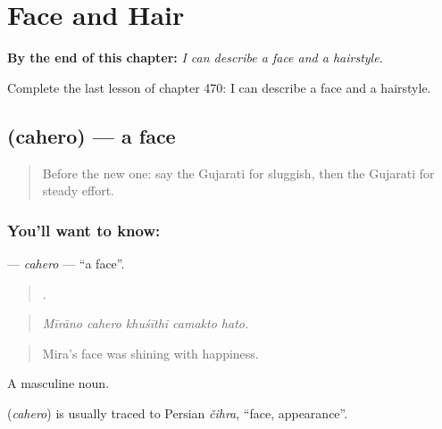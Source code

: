 
\chapter{Face and Hair}
\label{ch:gu-face-and-hair}

\begin{chapteropening}
\textbf{By the end of this chapter:} \emph{I can describe a face and a hairstyle.}

Complete the last lesson of chapter 470: I can describe a face and a hairstyle.
\end{chapteropening}

\section[\texorpdfstring{\gu{ચહેરો} (cahero)}{ચહેરો (cahero)}]{ (cahero) — a face}

\label{lesson:GU-C470-cahero}



\begin{quote}
Before the new one: say the Gujarati for sluggish, then the Gujarati for steady effort.
\end{quote}

\subsection*{You'll want to know: }
\textbf{} — \emph{cahero} — \textquotedblleft{}a face\textquotedblright{}.

\begin{quote}
    .
\end{quote}

\begin{quote}
\emph{Mīrāno cahero khuśīthī camakto hato.}
\end{quote}

\begin{quote}
Mira's face was shining with happiness.
\end{quote}

A masculine noun.

\begin{cousinweb}
\textbf{} (\emph{cahero}) is usually traced to Persian \emph{čihra}, \textquotedblleft{}face, appearance\textquotedblright{}.
\end{cousinweb}

